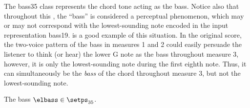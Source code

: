 
The \gls{bass35} class represents the chord tone acting as
the bass. 
Notice also that throughout this \thesisdiss{}, the ``bass''
is considered a perceptual phenomenon, which may or may not
correspond with the lowest-sounding note encoded in the
input representation \gls{bass19}.  is
a good example of this situation. In the original score, the
two-voice pattern of the bass in measures 1 and 2 could
easily persuade the listener to think (or hear) the lower G
note as the bass throughout measure 3, however, it is only
the lowest-sounding note during the first eighth note. Thus,
it can simultaneously be the \emph{bass} of the chord
throughout measure 3, but not the lowest-sounding note.

The bass $\elbass \in \setps_{35}$.






